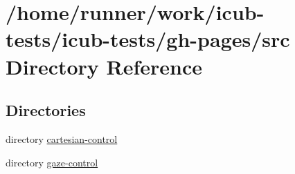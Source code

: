 \section{/home/runner/work/icub-\/tests/icub-\/tests/gh-\/pages/src Directory Reference}
\label{dir_68267d1309a1af8e8297ef4c3efbcdba}
\subsection*{Directories}
\begin{DoxyCompactItemize}
\item 
directory \hyperlink{dir_684cb237cc589112c257fb2b82bbd35f}{cartesian-\/control}
\item 
directory \hyperlink{dir_bb6085b5660958491f908beff56f4e11}{gaze-\/control}
\end{DoxyCompactItemize}
